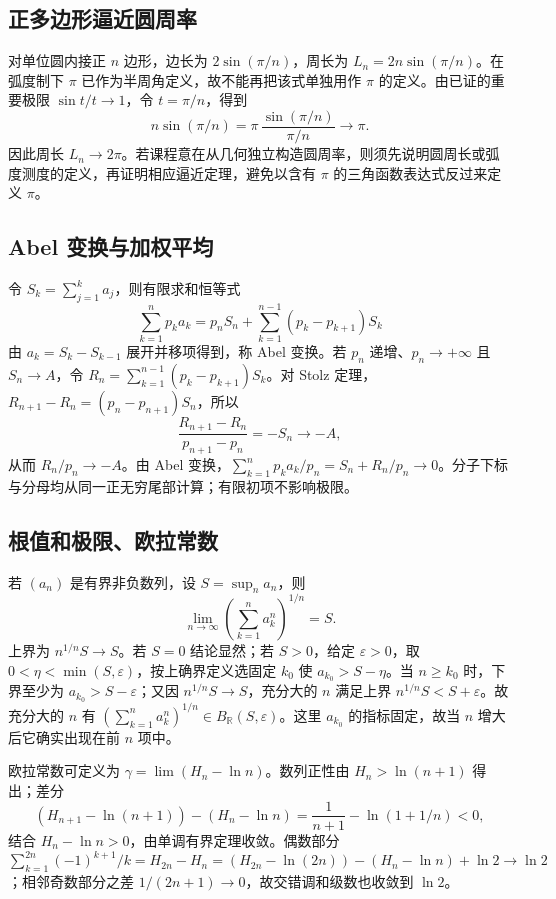 \documentclass[11pt,a4paper,UTF8]{ctexart}
\theoremstyle{definition}\newtheorem{definition}[theorem]{定义}
\theoremstyle{remark}\newtheorem{remark}[theorem]{说明}
\begin{document}
\subsection{正多边形逼近圆周率}
对单位圆内接正 $n$ 边形，边长为 $2\sin(\pi/n)$，周长为 $L_n=2n\sin(\pi/n)$。在弧度制下 $\pi$ 已作为半周角定义，故不能再把该式单独用作 $\pi$ 的定义。由已证的重要极限 $\sin t/t\to1$，令 $t=\pi/n$，得到
\[
n\sin(\pi/n)=\pi\,\frac{\sin(\pi/n)}{\pi/n}\longrightarrow\pi.
\]
因此周长 $L_n\to2\pi$。若课程意在从几何独立构造圆周率，则须先说明圆周长或弧度测度的定义，再证明相应逼近定理，避免以含有 $\pi$ 的三角函数表达式反过来定义 $\pi$。

\subsection{Abel 变换与加权平均}
令 $S_k=\sum_{j=1}^k a_j$，则有限求和恒等式
\[
\sum_{k=1}^n p_k a_k=p_nS_n+\sum_{k=1}^{n-1}(p_k-p_{k+1})S_k
\]
由 $a_k=S_k-S_{k-1}$ 展开并移项得到，称 Abel 变换。若 $p_n$ 递增、$p_n\to+\infty$ 且 $S_n\to A$，令 $R_n=\sum_{k=1}^{n-1}(p_k-p_{k+1})S_k$。对 Stolz 定理，$R_{n+1}-R_n=(p_n-p_{n+1})S_n$，所以
\[
\frac{R_{n+1}-R_n}{p_{n+1}-p_n}=-S_n\to-A,
\]
从而 $R_n/p_n\to-A$。由 Abel 变换，$\sum_{k=1}^n p_ka_k/p_n=S_n+R_n/p_n\to0$。分子下标与分母均从同一正无穷尾部计算；有限初项不影响极限。

\subsection{根值和极限、欧拉常数}
若 $(a_n)$ 是有界非负数列，设 $S=\sup_n a_n$，则
\[
\lim_{n\to\infty}\left(\sum_{k=1}^n a_k^n\right)^{1/n}=S.
\]
上界为 $n^{1/n}S\to S$。若 $S=0$ 结论显然；若 $S>0$，给定 $\varepsilon>0$，取 $0<\eta<\min(S,\varepsilon)$，按上确界定义选固定 $k_0$ 使 $a_{k_0}>S-\eta$。当 $n\ge k_0$ 时，下界至少为 $a_{k_0}>S-\varepsilon$；又因 $n^{1/n}S\to S$，充分大的 $n$ 满足上界 $n^{1/n}S<S+\varepsilon$。故充分大的 $n$ 有 $\left(\sum_{k=1}^n a_k^n\right)^{1/n}\in B_{\mathbb R}(S,\varepsilon)$。这里 $a_{k_0}$ 的指标固定，故当 $n$ 增大后它确实出现在前 $n$ 项中。

欧拉常数可定义为 $\gamma=\lim(H_n-\ln n)$。数列正性由 $H_n>\ln(n+1)$ 得出；差分
\[
(H_{n+1}-\ln(n+1))-(H_n-\ln n)=\frac1{n+1}-\ln(1+1/n)<0,
\]
结合 $H_n-\ln n>0$，由单调有界定理收敛。偶数部分 $\sum_{k=1}^{2n}(-1)^{k+1}/k=H_{2n}-H_n=(H_{2n}-\ln(2n))-(H_n-\ln n)+\ln2\to\ln2$；相邻奇数部分之差 $1/(2n+1)\to0$，故交错调和级数也收敛到 $\ln2$。
\end{document}
